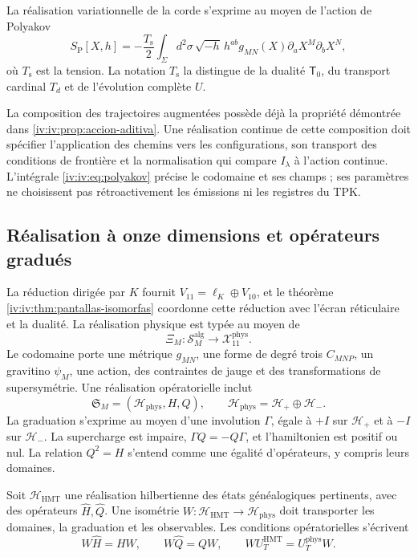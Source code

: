 La réalisation variationnelle de la corde s’exprime au moyen de
l’action de Polyakov
\begin{equation}
 S_{\mathrm P}[X,h]
 =-\frac{T_{\mathrm s}}2\int_\Sigma d^2\sigma\,
 \sqrt{-h}\,h^{ab}g_{MN}(X)
             \partial_aX^M\partial_bX^N,
 \label{iv:iv:eq:polyakov}
\end{equation}
où \(T_{\mathrm s}\) est la tension. La notation
\(T_{\mathrm s}\) la distingue de la dualité
\(\mathsf T_0\), du transport cardinal \(T_d\)
et de l’évolution complète \(U\).

La composition des trajectoires augmentées possède déjà la
propriété démontrée dans \ref{iv:iv:prop:accion-aditiva}.
Une réalisation continue de cette composition doit
spécifier l’application des chemins vers les configurations,
son transport des conditions de frontière et la
normalisation qui compare \(I_\lambda\) à l’action
continue. L’intégrale \eqref{iv:iv:eq:polyakov} précise
le codomaine et ses champs ; ses paramètres ne choisissent pas
rétroactivement les émissions ni les registres du TPK.

\subsection{Réalisation à onze dimensions et opérateurs gradués}

La réduction dirigée par \(K\) fournit
\(V_{11}=\ell_K\oplus V_{10}\), et le théorème
\ref{iv:iv:thm:pantallas-isomorfas} coordonne cette réduction
avec l’écran réticulaire et la dualité. La réalisation
physique est typée au moyen de
\[
 \Xi_M:\mathscr S_M^{\mathrm{alg}}
                  \longrightarrow\mathcal X_{11}^{\mathrm{phys}}.
\]
Le codomaine porte une métrique \(g_{MN}\), une forme de degré trois
\(C_{MNP}\), un gravitino \(\psi_M\), une action,
des contraintes de jauge et des transformations de
supersymétrie. Une réalisation opératorielle inclut
\[
 \mathfrak S_M=(\mathcal H_{\mathrm{phys}},H,Q),\qquad
 \mathcal H_{\mathrm{phys}}=\mathcal H_+\oplus\mathcal H_-.
\]
La graduation s’exprime au moyen d’une involution
\(\Gamma\), égale à \(+I\) sur \(\mathcal H_+\)
et à \(-I\) sur \(\mathcal H_-\). La supercharge
est impaire, \(\Gamma Q=-Q\Gamma\), et
l’hamiltonien est positif ou nul. La relation
\(Q^2=H\) s’entend comme une égalité d’opérateurs,
y compris leurs domaines.

Soit \(\mathcal H_{\mathrm{HMT}}\) une réalisation
hilbertienne des états généalogiques pertinents,
avec des opérateurs \(\widehat H,\widehat Q\). Une
isométrie \(W:\mathcal H_{\mathrm{HMT}}\to
\mathcal H_{\mathrm{phys}}\) doit transporter
les domaines, la graduation et les observables. Les conditions
opératorielles s’écrivent
\begin{equation}
 W\widehat H=HW,\qquad
 W\widehat Q=QW,\qquad
 WU_T^{\mathrm{HMT}}=U_T^{\mathrm{phys}}W.
 \label{iv:iv:eq:entrelazamiento-fisico}
\end{equation}

